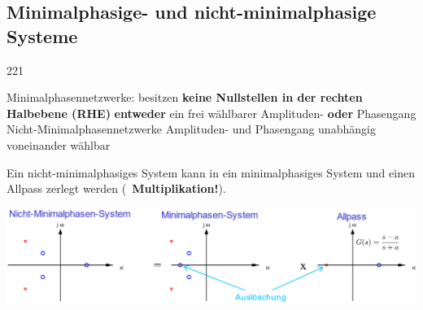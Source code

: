 \subsection{Minimalphasige- und nicht-minimalphasige Systeme}{221}

\begin{outline}
    \1 Minimalphasennetzwerke: 
        \2 besitzen \textbf{keine Nullstellen in der rechten Halbebene (RHE)}
        \2 \textbf{entweder} ein frei wählbarer Amplituden- \textbf{oder} Phasengang
    \1 Nicht-Minimalphasennetzwerke
        \2 Amplituden- und Phasengang unabhängig voneinander wählbar
\end{outline}


\label{Beispiel Zerlegung}

Ein nicht-minimalphasiges System kann in ein minimalphasiges System und einen Allpass zerlegt werden
(\textrightarrow\ \textbf{Multiplikation!}). 

\includegraphics[width=\columnwidth]{images/beispiel_minimalphasensystem.png}



